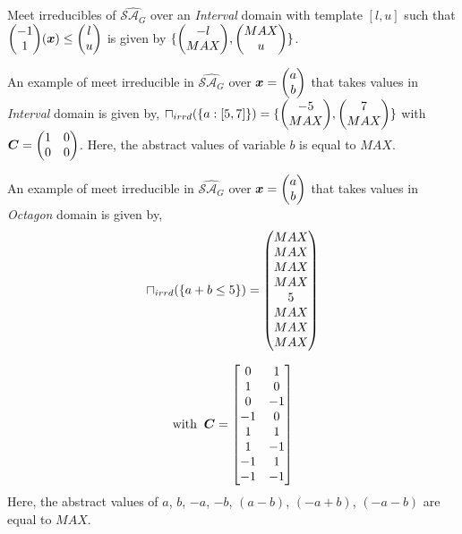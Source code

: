 Meet irreducibles of $\widehat{\mathcal{SA}_G}$ over an \emph{Interval} domain 
with template $[l,u]$ such that $\vecv{-1}{1}(\vec{x})\leq \vecv{l}{u}$ is given
by $\{\vecv{-l}{MAX}, \vecv{MAX}{u}\}$.
%
\begin{example}
  An example of meet irreducible in $\widehat{\mathcal{SA}_{G}}$ over 
  $\vec{\numvar} = \vecv{a}{b}$ that takes values in \emph{Interval} domain 
  is given by, $\meet_{irrd}(\{a:[5,7]\}) = \{\vecv{-5}{MAX}, \vecv{7}{MAX}\}$ 
  with $\mat{C}=\qmat{1}{0}{0}{0}$. Here, the abstract values of variable 
  $b$ is equal to $MAX$. \\
\end{example}  
%
\begin{example} 
  An example of meet irreducible in $\widehat{\mathcal{SA}_{G}}$ over 
  $\vec{\numvar} = \vecv{a}{b}$ that takes values in \emph{Octagon} domain 
  is given by, 
  \[\meet_{irrd}(\{a+b \leq 5\}) =
  \vecvvv{MAX}{MAX}{MAX}{MAX}{5}{MAX}{MAX}{MAX}\]
    
  \[\text{with}\;\; {\boldsymbol C}=
  \begin{bmatrix}
    0 & 1 \\
    1 & 0 \\
    0 & -1 \\
    -1 & 0 \\
    1 & 1 \\
    1 & -1 \\
    -1 & 1 \\
    -1 & -1
  \end{bmatrix}
  \]
   Here, the abstract values of $a$, $b$, $-a$, $-b$, $(a-b)$, $(-a+b)$, $(-a-b)$ are
  equal to $MAX$. \\
\end{example}  
%


